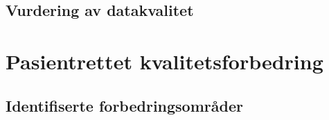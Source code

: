 \documentclass{article}
\begin{document}
    
    \subsection{Vurdering av datakvalitet}

    
    \newpage
    
    
    
    \section{Pasientrettet kvalitetsforbedring}

    
    \subsection{Identifiserte forbedringsområder}
    
     
\end{document}

